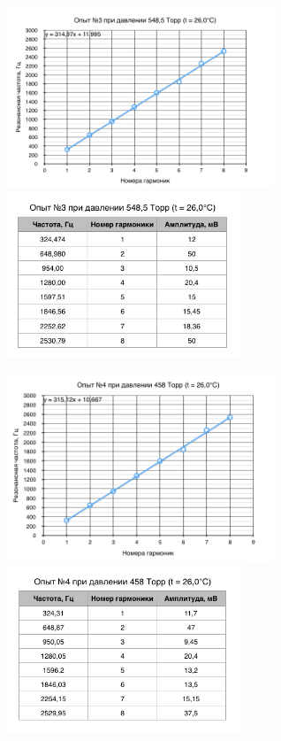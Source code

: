 \documentclass[a4paper,12pt]{article}
\begin{document}
\begin{figure}[h]
	\begin{multicols}{2}
		\hfill
		\includegraphics[width=80mm]{gr3.png}
		\hfill
		\label{gr3}
		\hfill
		\includegraphics[width=70mm]{t3.png}
		\hfill
		\label{t3}
	\end{multicols}
\end{figure}
\begin{figure}[h]
	\begin{multicols}{2}
		\hfill
		\includegraphics[width=80mm]{gr4.png}
		\hfill
		\label{gr4}
		\hfill
		\includegraphics[width=70mm]{t4.png}
		\hfill
		\label{t4}
	\end{multicols}
\end{figure}
\end{document}
